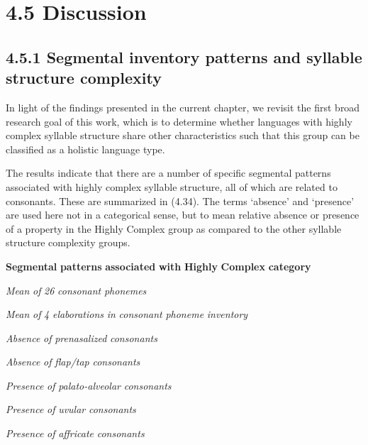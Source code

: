 \section{4.5 Discussion}
\subsection{4.5.1 Segmental inventory patterns and syllable structure complexity}

  In light of the findings presented in the current chapter, we revisit the first broad research goal of this work, which is to determine whether languages with highly complex syllable structure share other characteristics such that this group can be classified as a holistic language type.



  The results indicate that there are a number of specific segmental patterns associated with highly complex syllable structure, all of which are related to consonants. These are summarized in (4.34). The terms ‘absence’ and ‘presence’ are used here not in a categorical sense, but to mean relative absence or presence of a property in the Highly Complex group as compared to the other syllable structure complexity groups.



\ea\label{ex:(4.34)}
  \textbf{Segmental} \textbf{patterns} \textbf{associated} \textbf{with} \textbf{Highly} \textbf{Complex} \textbf{category}



\textit{Mean} \textit{of} \textit{26} \textit{consonant} \textit{phonemes}



\textit{Mean} \textit{of} \textit{4} \textit{elaborations} \textit{in} \textit{consonant} \textit{phoneme} \textit{inventory}



\textit{Absence} \textit{of} \textit{prenasalized} \textit{consonants}



\textit{Absence} \textit{of} \textit{flap/tap} \textit{consonants}



\textit{Presence} \textit{of} \textit{palato-alveolar} \textit{consonants}



\textit{Presence} \textit{of} \textit{uvular} \textit{consonants}



\textit{Presence} \textit{of} \textit{affricate} \textit{consonants} 



